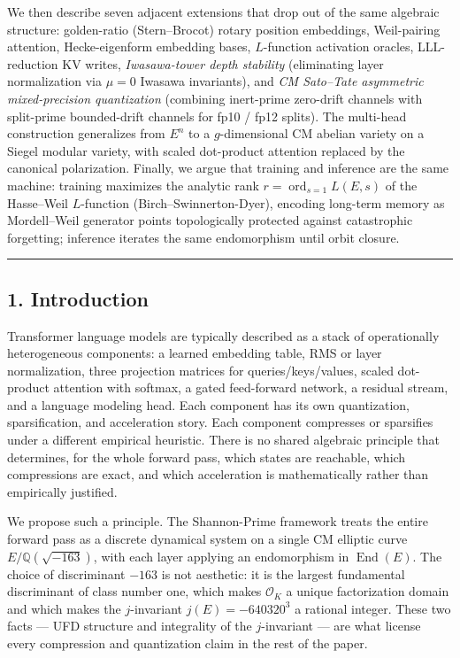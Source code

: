\documentclass[
  11pt,
]{article}
\begin{document}
We then describe seven adjacent extensions that drop out of the same
algebraic structure: golden-ratio (Stern--Brocot) rotary position
embeddings, Weil-pairing attention, Hecke-eigenform embedding bases,
\(L\)-function activation oracles, LLL-reduction KV writes,
\emph{Iwasawa-tower depth stability} (eliminating layer normalization
via \(\mu = 0\) Iwasawa invariants), and \emph{CM Sato--Tate asymmetric
mixed-precision quantization} (combining inert-prime zero-drift channels
with split-prime bounded-drift channels for fp10 / fp12 splits). The
multi-head construction generalizes from \(E^n\) to a \(g\)-dimensional
CM abelian variety on a Siegel modular variety, with scaled dot-product
attention replaced by the canonical polarization. Finally, we argue that
training and inference are the same machine: training maximizes the
analytic rank \(r = \operatorname{ord}_{s=1} L(E,s)\) of the Hasse--Weil
\(L\)-function (Birch--Swinnerton-Dyer), encoding long-term memory as
Mordell--Weil generator points topologically protected against
catastrophic forgetting; inference iterates the same endomorphism until
orbit closure.

\begin{center}\rule{0.5\linewidth}{0.5pt}\end{center}

\hypertarget{introduction}{%
\subsection{1. Introduction}\label{introduction}}

Transformer language models are typically described as a stack of
operationally heterogeneous components: a learned embedding table, RMS
or layer normalization, three projection matrices for
queries/keys/values, scaled dot-product attention with softmax, a gated
feed-forward network, a residual stream, and a language modeling head.
Each component has its own quantization, sparsification, and
acceleration story. Each component compresses or sparsifies under a
different empirical heuristic. There is no shared algebraic principle
that determines, for the whole forward pass, which states are reachable,
which compressions are exact, and which acceleration is mathematically
rather than empirically justified.

We propose such a principle. The Shannon-Prime framework treats the
entire forward pass as a discrete dynamical system on a single CM
elliptic curve \(E / \mathbb{Q}(\sqrt{-163})\), with each layer applying
an endomorphism in \(\operatorname{End}(E)\). The choice of discriminant
\(-163\) is not aesthetic: it is the largest fundamental discriminant of
class number one, which makes \(\mathcal{O}_K\) a unique factorization
domain and which makes the \(j\)-invariant \(j(E) = -640320^3\) a
rational integer. These two facts --- UFD structure and integrality of
the \(j\)-invariant --- are what license every compression and
quantization claim in the rest of the paper.
\end{document}
